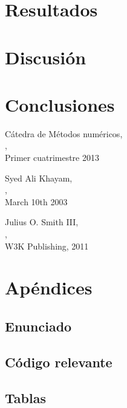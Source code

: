 \documentclass[%
	compressed,
	titlepage,
	narroweqnarray,
	inline,
	twoside,
	]{ieee}
\begin{document}



\section{Resultados}



\section{Discusi\'on}



\section{Conclusiones}




\begin{thebibliography}{1}

C\'atedra de M\'etodos num\'ericos,\\
,\\
\newblock Primer cuatrimestre 2013

Syed Ali Khayam,\\
,\\
\newblock March 10th 2003

Julius O. Smith III,\\
,\\
W3K Publishing, 2011

\end{thebibliography}


\newpage

\section{Ap\'endices}

\subsection{Enunciado}


\newpage

\subsection{C\'odigo relevante}


\newpage

\subsection{Tablas}


\end{document}
